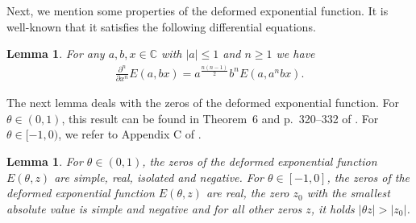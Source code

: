 \documentclass[12pt]{article}
\newcommand{\C}{\mathbb{C}} %
\newcommand{\1}{\mathds{1}}
\theoremstyle{definition}
\theoremstyle{plain}
\newtheorem{Lemma}[definition]{Lemma}
\newtheorem{Corollary}[definition]{Corollary}
\theoremstyle{remark}
\begin{document}
Next, we mention some properties of the deformed exponential function. It is well-known that it satisfies the following differential equations.
\begin{Lemma}
  For any $a,b,x\in\C$ with $|a|\le1$ and $n\geq 1$ we have
\begin{align}\label{eqn:dgl_n_exponential}
    \frac{\partial^n}{\partial x^n}E(a,bx)=a^{\frac{n(n-1)}{2}}b^nE(a,a^nbx).
\end{align}
\end{Lemma}

The next lemma deals with the zeros of the deformed exponential function. For $\theta\in(0,1)$, this result can be found in Theorem~6 and p.\ 320--332 of \cite{Morris}. For $\theta\in[-1,0)$, we refer to Appendix C of \cite{dyachenko}.


\begin{Lemma}\label{nullstellen_exponentialfunktion}
For $\theta\in(0,1)$, the zeros of the deformed exponential function $E(\theta,z)$ are simple, real, isolated and negative. For $\theta\in[-1,0]$, the zeros of the deformed exponential function $E(\theta,z)$ are real, the zero $z_0$ with the smallest absolute value is simple and negative and for all other zeros $z$, it holds $|\theta z|>|z_0|$.
\end{Lemma}
\end{document}
